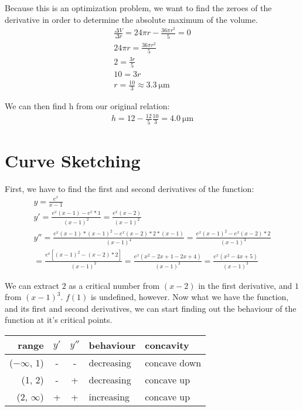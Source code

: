 \documentclass{article}
\begin{document}
Because this is an optimization problem, we want to find the zeroes of the derivative in order to determine the absolute maximum of the volume.
\begin{eqnarray}
	\frac{\Delta V}{\Delta r} = 24 \pi r - \frac{36 \pi r^2}{5} = 0 \\
	24 \pi r = \frac{36 \pi r^2}{5} \\
	2 = \frac{3 r}{5} \\
	10 = 3r \\
	r = \frac{10}{3} \approx \SI{3.3}{\micro\metre}
\end{eqnarray}

We can then find h from our original relation:
\begin{eqnarray}
	h = 12 - \frac{12}{5} \frac{10}{3} = \SI{4.0}{\micro\metre}
\end{eqnarray}

\section{Curve Sketching}
First, we have to find the first and second derivatives of the function:
\begin{eqnarray}
	y = \frac{e^x}{x-1} \\
	y' = \frac{e^x (x-1) - e^x * 1}{(x-1)^2} 
	= \frac{e^x (x-2)}{(x-1)^2} \\
	y'' = \frac{e^x (x-1) * (x-1)^2 - e^x (x-2) * 2 * (x-1)}{(x-1)^4} 
	= \frac{e^x (x-1)^2 - e^x (x-2) * 2 }{(x-1)^3} \\
	= \frac{e^x \left[(x-1)^2 -(x-2) * 2\right] }{(x-1)^3}
	= \frac{e^x \left(x^2 -2x + 1 -2x + 4\right) }{(x-1)^3}
	= \frac{e^x \left(x^2 -4x + 5\right) }{(x-1)^3}
\end{eqnarray}

We can extract $2$ as a critical number from $(x-2)$ in the first derivative, and $1$ from $(x-1)^3$. $f(1)$ is undefined, however. 
\newline
Now what we have the function, and its first and second derivatives, we can start finding out the behaviour of the function at it's critical points.  
\newline
\newline
\begin{tabular}{ r | c c l l }
	range & $y'$ & $y''$ & behaviour & concavity \\
	\hline
	($-\infty$, 1) & - & - & decreasing & concave down \\
	(1, 2)         & - & + & decreasing & concave up \\
	(2, $\infty$)  & + & + & increasing & concave up \\
\end{tabular}
\end{document}
